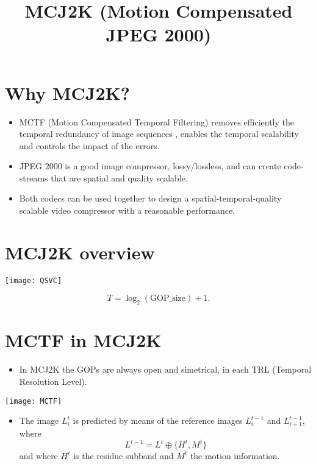 \title{MCJ2K (Motion Compensated JPEG 2000)}

\maketitle
\tableofcontents

\section{Why MCJ2K?}
\begin{itemize}
\item MCTF (Motion Compensated Temporal Filtering) \cite{2003.secker}
  removes efficiently the temporal redundancy of image sequences
  \cite{2007.schwarz}, enables the temporal scalability and controls the
  impact of the errors.
\item JPEG 2000 is a good image compressor, lossy/lossless, and can
  create code-streams that are spatial and quality scalable.
\item Both codecs can be used together to design a
  spatial-temporal-quality scalable video compressor with a reasonable
  performance.
\end{itemize}

\section{MCJ2K overview}
\begin{center}
  \texttt{[image: QSVC]}
\end{center}
\begin{equation}
  T = \log_2(\text{GOP\_size})+1.
\end{equation}

\section{MCTF in MCJ2K}
\begin{itemize}
\item In MCJ2K the GOPs are always open and simetrical, in each
  TRL (Temporal Resolution Level).
\end{itemize}
\begin{center}
  \texttt{[image: MCTF]}
\end{center}
\begin{itemize}
\item The image $L^{t}_{i}$ is predicted by means of the reference
  images $L^{t-1}_{i}$ and $L^{t-1}_{i+1}$, where
\begin{equation}
  L^{t-1} = L^t \oplus \{H^t,M^t\}
\end{equation}
and where $H^t$ is the residue subband and $M^t$ the motion
information.
\end{itemize}

